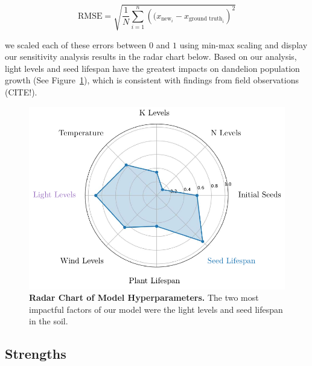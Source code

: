 \begin{equation}
    \text{RMSE} = \sqrt{\frac{1}{N}\sum\limits_{i=1}^{n} \left((x_{\text{new}_i} - x_{\text{ground truth}_i}\right)^2}
\end{equation}

we scaled each of these errors between \(0\) and \(1\) using min-max scaling and display our sensitivity analysis results in the radar chart below. Based on our analysis, light levels and seed lifespan have the greatest impacts on dandelion population growth (See Figure~\ref{fig:radarchart1}), which is consistent with findings from field observations (CITE!).

\begin{figure}[h!]
\centering
    \includegraphics[scale=0.6]{figures/radarchart1.pdf}
    \captionsetup{width=0.9\textwidth}
    \caption{\textbf{Radar Chart of Model Hyperparameters.} The two most impactful factors of our model were the light levels and seed lifespan in the soil.} 
    \label{fig:radarchart1}
\end{figure}


\subsection{Strengths}

